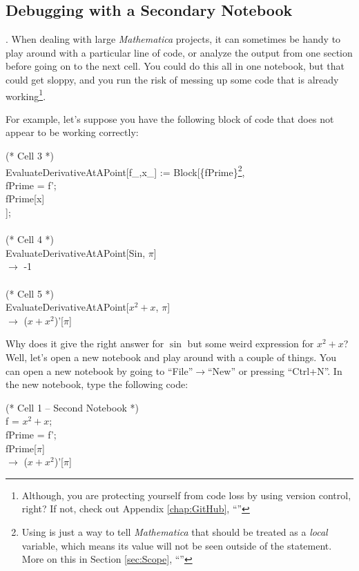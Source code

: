 \subsection{Debugging with a Secondary Notebook}. When dealing with large \emph{Mathematica} projects, it can sometimes be handy to play around with a particular line of code, or analyze the output from one section before going on to the next cell. You could do this all in one notebook, but that could get sloppy, and you run the risk of messing up some code that is already working\footnote{Although, you are protecting yourself from code loss by using version control, right? If not, check out Appendix \ref{chap:GitHub}, ``''}.

For example, let's suppose you have the following block of code that does not appear to be working correctly:

\begin{code}
	   (* Cell 3 *)\\
	   EvaluateDerivativeAtAPoint[f\_,x\_] := Block[\{fPrime\}\footnote{Using  is just a way to tell \emph{Mathematica} that  should be treated as a \emph{local} variable, which means its value will not be seen outside of the  statement. More on this in Section \ref{sec:Scope}, ``''}, \\
	   	fPrime = f';\\
		fPrime[x]\\
	   ];\\
		\\
	   (* Cell 4 *)\\
	   EvaluateDerivativeAtAPoint[Sin, $\pi$]\\
	   $\rightarrow$ -1\\
	   \\
	   (* Cell 5 *)\\
	   EvaluateDerivativeAtAPoint[$x^2 + x$, $\pi$]\\
	   $\rightarrow$ ($x + x^2$)'[$\pi$]
\end{code}

Why does it give the right answer for $\sin$ but some weird expression for $x^2 + x$? Well, let's open a new notebook and play around with a couple of things. You can open a new notebook by going to ``File''$\rightarrow$``New'' or pressing ``Ctrl+N''. In the new notebook, type the following code:

\begin{code}
	   (* Cell 1 -- Second Notebook *)\\
	   f = $x^2 + x$;\\
	   fPrime = f';\\
	   fPrime[$\pi$]\\
	   $\rightarrow$ ($x + x^2$)'[$\pi$]
\end{code}

